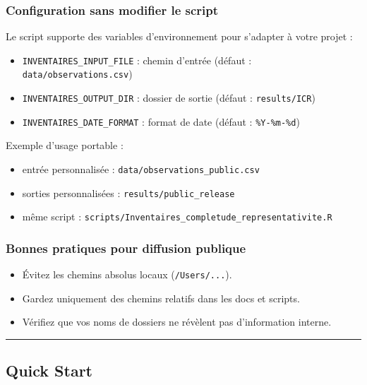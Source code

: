 \subsubsection{Configuration sans modifier le
script}\label{configuration-sans-modifier-le-script}

Le script supporte des variables d'environnement pour s'adapter à votre
projet :

\begin{itemize}
\tightlist
\item
  \texttt{INVENTAIRES\_INPUT\_FILE} : chemin d'entrée (défaut :
  \texttt{data/observations.csv})
\item
  \texttt{INVENTAIRES\_OUTPUT\_DIR} : dossier de sortie (défaut :
  \texttt{results/ICR})
\item
  \texttt{INVENTAIRES\_DATE\_FORMAT} : format de date (défaut :
  \texttt{\%Y-\%m-\%d})
\end{itemize}

Exemple d'usage portable :

\begin{itemize}
\tightlist
\item
  entrée personnalisée : \texttt{data/observations\_public.csv}
\item
  sorties personnalisées : \texttt{results/public\_release}
\item
  même script :
  \texttt{scripts/Inventaires\_completude\_representativite.R}
\end{itemize}

\subsubsection{Bonnes pratiques pour diffusion
publique}\label{bonnes-pratiques-pour-diffusion-publique}

\begin{itemize}
\tightlist
\item
  Évitez les chemins absolus locaux (\texttt{/Users/...}).
\item
  Gardez uniquement des chemins relatifs dans les docs et scripts.
\item
  Vérifiez que vos noms de dossiers ne révèlent pas d'information
  interne.
\end{itemize}

\begin{center}\rule{0.5\linewidth}{0.5pt}\end{center}

\subsection{Quick Start}\label{quick-start}

